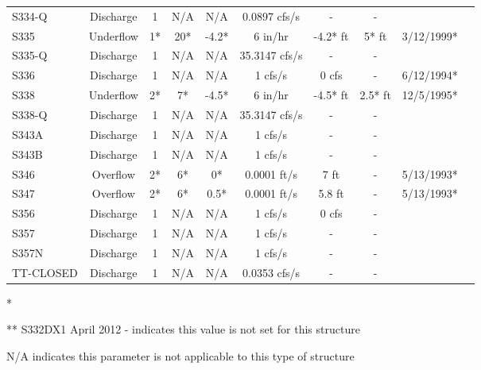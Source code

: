 \begin{table}[h]
\begin{tabular}{@{}lccccccccc@{}}
{S334-Q}        & Discharge     & 1        & N/A         & N/A          & 0.0897 cfs/s   & -               & -          &             \\
{S335}          & Underflow     & 1*       & 20*         & -4.2*        & 6 in/hr        & -4.2* ft        & 5* ft      & 3/12/1999*  \\
{S335-Q}        & Discharge     & 1        & N/A         & N/A          & 35.3147 cfs/s  & -               & -          &             \\
{S336}          & Discharge     & 1        & N/A         & N/A          & 1 cfs/s        &  0 cfs          & -          & 6/12/1994*  \\
{S338}          & Underflow     & 2*       & 7*          & -4.5*        & 6 in/hr        &  -4.5* ft       & 2.5* ft    & 12/5/1995*  \\
{S338-Q}        & Discharge     & 1        & N/A         & N/A          & 35.3147 cfs/s  &  -              & -          &             \\
{S343A}         & Discharge     & 1        & N/A         & N/A          & 1 cfs/s        &  -              & -          &             \\
{S343B}         & Discharge     & 1        & N/A         & N/A          & 1 cfs/s        &  -              & -          &             \\
{S346}          & Overflow      & 2*       & 6*          & 0*           & 0.0001 ft/s    &  7 ft           & -          & 5/13/1993*  \\
{S347}          & Overflow      & 2*       & 6*          & 0.5*         & 0.0001 ft/s    &  5.8 ft         & -          & 5/13/1993*  \\
{S356}          & Discharge     & 1        & N/A         & N/A          & 1 cfs/s        &  0 cfs          & -          &             \\
{S357}          & Discharge     & 1        & N/A         & N/A          & 1 cfs/s        &  -              & -          &             \\
{S357N}         & Discharge     & 1        & N/A         & N/A          & 1 cfs/s        &  -              & -          &             \\
{TT-CLOSED}     & Discharge     & 1        & N/A         & N/A          & 0.0353 cfs/s   &  -              & -          &             \\
\hline
\end{tabular}

* \cite{corp2005}

** S332DX1 April 2012
- indicates this value is not set for this structure

N/A indicates this parameter is not applicable to this type of structure
\end{table}
\normalsize

